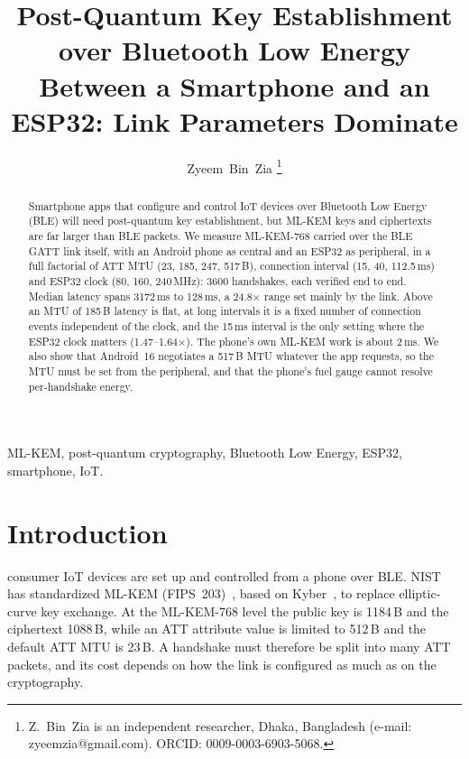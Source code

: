 \documentclass[journal]{IEEEtran}
\begin{document}
\title{Post-Quantum Key Establishment over Bluetooth Low Energy Between a Smartphone and an ESP32: Link Parameters Dominate}

\author{Zyeem~Bin~Zia%
\thanks{Z.~Bin~Zia is an independent researcher, Dhaka, Bangladesh (e-mail:
zyeemzia@gmail.com). ORCID: 0009-0003-6903-5068.}}


\maketitle

\begin{abstract}
Smartphone apps that configure and control IoT devices over Bluetooth Low
Energy (BLE) will need post-quantum key establishment, but ML-KEM keys and
ciphertexts are far larger than BLE packets. We measure ML-KEM-768 carried over
the BLE GATT link itself, with an Android phone as central and an ESP32 as
peripheral, in a full factorial of ATT MTU (23, 185, 247, 517\,B), connection
interval (15, 40, 112.5\,ms) and ESP32 clock (80, 160, 240\,MHz): 3600
handshakes, each verified end to end. Median latency spans 3172\,ms to
128\,ms, a 24.8$\times$ range set mainly by the link. Above an MTU of 185\,B
latency is flat, at long intervals it is a fixed number of connection events
independent of the clock, and the 15\,ms interval is the only setting where
the ESP32 clock matters (1.47--1.64$\times$). The phone's own ML-KEM work is
about 2\,ms. We also show that Android~16 negotiates a 517\,B MTU whatever the
app requests, so the MTU must be set from the peripheral, and that the
phone's fuel gauge cannot resolve per-handshake energy.
\end{abstract}

\begin{IEEEkeywords}
ML-KEM, post-quantum cryptography, Bluetooth Low Energy, ESP32, smartphone, IoT.
\end{IEEEkeywords}

\section{Introduction}
 consumer IoT devices are set up and controlled from a
phone over BLE. NIST has standardized ML-KEM (FIPS~203)~\cite{fips203}, based
on Kyber~\cite{bos2018kyber}, to replace elliptic-curve key exchange. At the
ML-KEM-768 level the public key is 1184\,B and the ciphertext 1088\,B, while
an ATT attribute value is limited to 512\,B and the default ATT MTU is 23\,B.
A handshake must therefore be split into many ATT packets, and its cost depends
on how the link is configured as much as on the cryptography.
\end{document}
